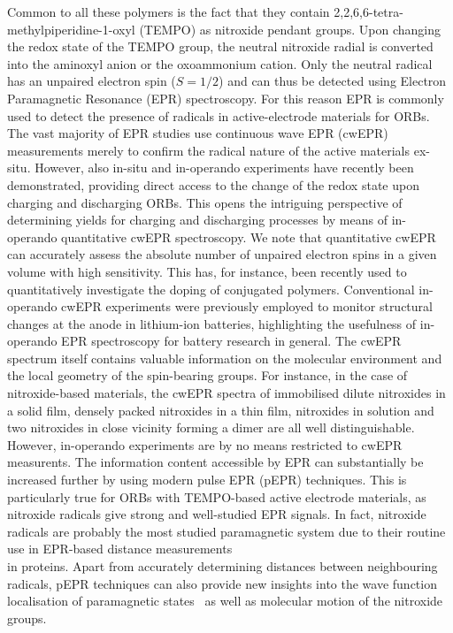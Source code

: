 \documentclass{WileyMSP-template}
\begin{document}
Common to all these polymers is the fact that they contain 2,2,6,6-tetra-methylpiperidine-1-oxyl (TEMPO) as nitroxide pendant groups. Upon changing the redox state of the TEMPO group, the neutral nitroxide radial is converted into the aminoxyl anion or the oxoammonium cation. Only the neutral radical has an unpaired electron spin ($S = 1/2$) and can thus be detected using Electron Paramagnetic Resonance (EPR) spectroscopy. For this reason EPR is commonly used to detect the presence of radicals in active-electrode materials for ORBs.\cite{nakahara2002_cpl, nishide2004_electact, bahaceci2013_jpowersources, aydin2015_jsoistatelect, khodeir2019_softmatter} The vast majority of EPR studies use continuous wave EPR (cwEPR) measurements merely to confirm the radical nature of the active materials ex-situ. However, also in-situ and in-operando experiments have recently been demonstrated, providing direct access to the change of the redox state upon charging and discharging ORBs.\cite{huang2016_jpowersources, kanzaki2018_acsappmat} This opens the intriguing perspective of determining yields for charging and discharging processes by means of in-operando quantitative cwEPR spectroscopy. We note that quantitative cwEPR can accurately assess the absolute number of unpaired electron spins in a given volume with high sensitivity. This has, for instance, been recently used to quantitatively investigate the doping of conjugated polymers.\cite{arvind2020_jpcb, pingel2016_aem}
\bigbreak
Conventional in-operando cwEPR experiments were previously employed to monitor structural changes at the anode in lithium-ion batteries,\cite{wandt2015_ees} highlighting the usefulness of in-operando EPR spectroscopy for battery research in general. The cwEPR spectrum itself contains valuable information on the molecular environment and the local geometry of the spin-bearing groups. For instance, in the case of nitroxide-based materials, the cwEPR spectra of immobilised dilute nitroxides in a solid film, densely packed nitroxides in a thin film, nitroxides in solution and two nitroxides in close vicinity forming a dimer are all well distinguishable.\cite{santangelo2008_jpcb,clark2016_concmagnres}
\bigbreak
However, in-operando experiments are by no means restricted to cwEPR measurents. The information content accessible by EPR can substantially be increased further by using modern pulse EPR (pEPR) techniques.\cite{schweiger2001_book} This is particularly true for ORBs with TEMPO-based active electrode materials, as nitroxide radicals give strong and well-studied EPR signals. In fact, nitroxide radicals are probably the most studied paramagnetic system due to their routine use in EPR-based distance measurements\\ in proteins.\cite{jeschke2012_annrevphyschem} Apart from accurately determining distances between neighbouring radicals, pEPR techniques can also provide new insights into the wave function localisation of paramagnetic states~\cite{steyrleuthner2017_pccp} as well as molecular motion of the nitroxide groups.\cite{clark2016_concmagnres}
\end{document}
